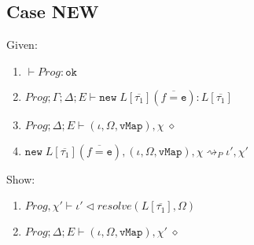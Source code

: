 \subsection{Case NEW}

Given:
\begin{enumerate}[label=\arabic*)]
    \item \label{proof:new-1} $\vdash Prog : \texttt{ok}$
    \item \label{proof:new-2} $Prog; \Gamma; \Delta; E \vdash \texttt{new} \; L[\overline{\tau_1}](\overline{f = \texttt{e}}) : L[\overline{\tau_1}]$
    \item \label{proof:new-3} $Prog; \Delta; E \vdash (\iota, \Omega, \texttt{vMap}), \chi \; \diamond$
    \item \label{proof:new-4} $\texttt{new} \; L[\overline{\tau_1}](\overline{f = \texttt{e}}), (\iota, \Omega, \texttt{vMap}), \chi \rightsquigarrow_P \iota', \chi' $
\end{enumerate}
Show:
\begin{enumerate}[label=\arabic*), resume]
    \item \label{proof:new-5} $Prog, \chi' \vdash \iota' \triangleleft resolve(L[\overline{\tau_1}], \Omega)$
    \item \label{proof:new-6} $Prog; \Delta; E \vdash (\iota, \Omega, \texttt{vMap}), \chi' \; \diamond$
\end{enumerate}
